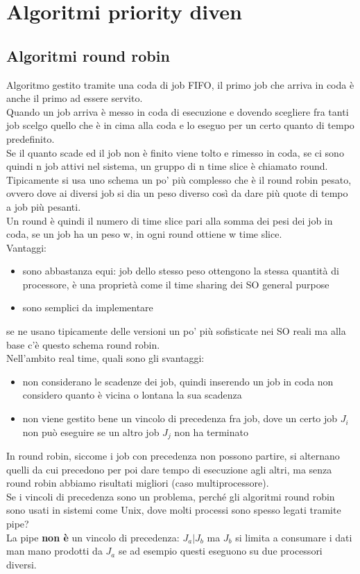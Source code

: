 \documentclass[12pt, oneside]{extbook}
\begin{document}
\chapter{Algoritmi priority diven}

\section{Algoritmi round robin}
Algoritmo gestito tramite una coda di job FIFO, il primo job che arriva in coda è anche il primo ad essere servito.\\
Quando un job arriva è messo in coda di esecuzione e dovendo scegliere fra tanti job scelgo quello che è in cima alla coda e lo eseguo per un certo quanto di tempo predefinito.\\
Se il quanto scade ed il job non è finito viene tolto e rimesso in coda, se ci sono quindi n job attivi nel sistema, un gruppo di n time slice è chiamato round.\\
Tipicamente si usa uno schema un po' più complesso che è il round robin pesato, ovvero dove ai diversi job si dia un peso diverso così da dare più quote di tempo a job più pesanti.\\
Un round è quindi il numero di time slice pari alla somma dei pesi dei job in coda, se un job ha un peso w, in ogni round ottiene w time slice.\\
Vantaggi:
\begin{itemize}
	\item sono abbastanza equi: job dello stesso peso ottengono la stessa quantità di processore, è una proprietà come il time sharing dei SO general purpose
	\item sono semplici da implementare
\end{itemize}
se ne usano tipicamente delle versioni un po' più sofisticate nei SO reali ma alla base c'è questo schema round robin.\\
Nell'ambito real time, quali sono gli svantaggi:
\begin{itemize}
	\item non considerano le scadenze dei job, quindi inserendo un job in coda non considero quanto è vicina o lontana la sua scadenza
	\item non viene gestito bene un vincolo di precedenza fra job, dove un certo job $J_i$ non può eseguire se un altro job $J_j$ non ha terminato
\end{itemize}
In round robin, siccome i job con precedenza non possono partire, si alternano quelli da cui precedono per poi dare tempo di esecuzione agli altri, ma senza round robin abbiamo risultati migliori (caso multiprocessore).\\
Se i vincoli di precedenza sono un problema, perché gli algoritmi round robin sono usati in sistemi come Unix, dove molti processi sono spesso legati tramite pipe?\\La pipe \textbf{non è} un vincolo di precedenza: $J_a | J_b$ ma $J_b$ si limita a consumare i dati man mano prodotti da $J_a$ se ad esempio questi eseguono su due processori diversi.
\end{document}
